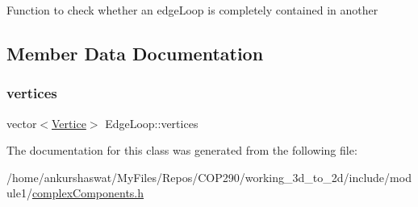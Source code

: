 Function to check whether an edge\+Loop is completely contained in another 

\subsection{Member Data Documentation}
\mbox{\label{classEdgeLoop_a781d9dd73f8b69c7b0075d4297f6b277}} 
\subsubsection{\texorpdfstring{vertices}{vertices}}
{\footnotesize\ttfamily vector$<$\hyperlink{structVertice}{Vertice}$>$ Edge\+Loop\+::vertices}



The documentation for this class was generated from the following file\+:\begin{DoxyCompactItemize}
\item 
/home/ankurshaswat/\+My\+Files/\+Repos/\+C\+O\+P290/working\+\_\+3d\+\_\+to\+\_\+2d/include/module1/\hyperlink{complexComponents_8h}{complex\+Components.\+h}\end{DoxyCompactItemize}
